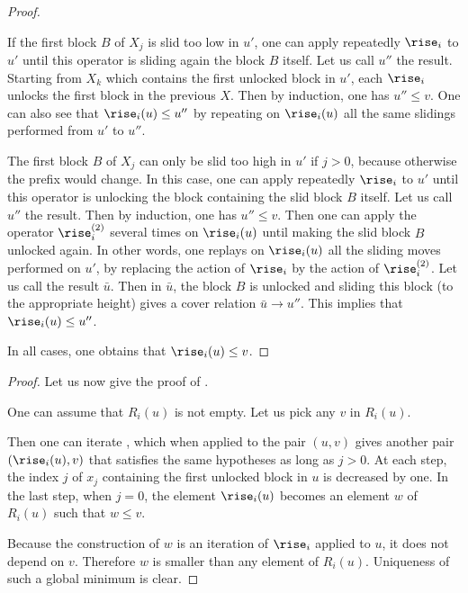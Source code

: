 \begin{proof}
\begin{enumerate}
  If the first block $B$ of $X_j$ is slid too low in $u'$, one can
  apply repeatedly $\rise_i$ to $u'$ until this operator is sliding
  again the block $B$ itself. Let us call $u''$ the result. Starting
  from $X_k$ which contains the first unlocked block in $u'$, each
  $\rise_i$ unlocks the first block in the previous $X$. Then by
  induction, one has $u'' \leq v$. One can also see that
  $\rise_i(u) \leq u''$ by repeating on $\rise_i(u)$ all the same
  slidings performed from $u'$ to $u''$.

  The first block $B$ of $X_j$ can only be slid too high in $u'$ if
  $j > 0$, because otherwise the prefix would change. In this case,
  one can apply repeatedly $\rise_i$ to $u'$ until this operator is
  unlocking the block containing the slid block $B$ itself. Let us
  call $u''$ the result. Then by induction, one has $u'' \leq v$. Then
  one can apply the operator $\rise^{(2)}_i$ several times on
  $\rise_i(u)$ until making the slid block $B$ unlocked again. In
  other words, one replays on $\rise_i(u)$ all the sliding moves
  performed on $u'$, by replacing the action of $\rise_i$ by the
  action of $\rise^{(2)}_i$. Let us call the result $\bar{u}$. Then in $\bar{u}$,
  the block $B$ is unlocked and sliding this block (to the appropriate
  height) gives a cover relation $\bar{u} \to u''$. This implies that
  $\rise_i(u) \leq u''$.
\end{enumerate}

  In all cases, one obtains that $\rise_i(u) \leq v$.
\end{proof}

\begin{proof}
Let us now give the proof of . 

One can assume that $R_i(u)$ is not empty. Let us pick any $v$ in $R_i(u)$.

Then one can iterate , which when applied to the
pair $(u,v)$ gives another pair $(\rise_i(u),v)$ that satisfies the
same hypotheses as long as $j > 0$. At each step, the index $j$ of
$x_j$ containing the first unlocked block in $u$ is decreased by
one. In the last step, when $j=0$, the element $\rise_i(u)$ becomes an
element $w$ of $R_i(u)$ such that $w \leq v$.

Because the construction of $w$ is an iteration of $\rise_i$ applied
to $u$, it does not depend on $v$. Therefore $w$ is smaller than any
element of $R_i(u)$. Uniqueness of such a global minimum is clear.
\end{proof}


